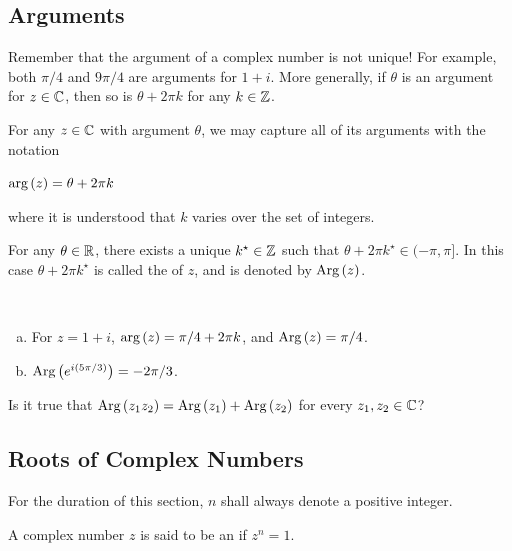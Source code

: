 \documentclass[11pt,fleqn,dvipsnames,usenames]{article}
\newcommand{\p}{\noindent}
\begin{document}
\subsection{Arguments}

\p Remember that the argument of a complex number is not unique!  For example, both $\pi/4$ and $9\pi/4$ are arguments for $1 + i$.  More generally, if $\theta$ is an argument for $z\in\mathbb{C}$, then so is $\theta + 2\pi k$ for any $k\in \mathbb{Z}$.
\vsp

\notation For any $z\in\mathbb{C}$ with argument $\theta$, we may capture all of its arguments with the notation
\begin{center}
$\text{arg}\left(z\right) = \theta + 2\pi k$
\end{center}
where it is understood that $k$ varies over the set of integers.
\vsp

\fact For any $\theta\in\mathbb{R}$, there exists a unique $k^{\star}\in\mathbb{Z}$ such that $\theta + 2\pi k^{\star}\in (-\pi, \pi]$.  In this case $\theta + 2\pi k^{\star}$ is called the  of $z$, and is denoted by $\text{Arg}\left(z\right)$.
\vsp

\begin{examples}~
\begin{enumerate}[(a)]
\item For $z = 1 + i$, $\text{arg}\left(z\right) = \pi/4 + 2\pi k$, and $\text{Arg}\left(z\right) = \pi/4$.
\item $\text{Arg}\left(e^{i(5\pi/3)}\right) = -2\pi/3$.
\end{enumerate}
\end{examples}

\begin{exercise}
Is it true that $\text{Arg}\left(z_1z_2\right) = \text{Arg}\left(z_1\right) + \text{Arg}\left(z_2\right)$ for every $z_{1},z_{2}\in\mathbb{C}$?
\end{exercise}

\subsection{Roots of Complex Numbers}\label{rootsofunitysection}

\p For the duration of this section, $n$ shall always denote a positive integer.
%
\begin{definition}
A complex number $z$ is said to be an  if $z^{n} = 1$.
\end{definition}
\end{document}
